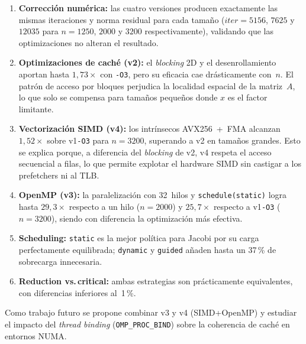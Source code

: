 \documentclass[a4paper,twocolumn]{article}
\begin{document}
\begin{enumerate}
  \item \textbf{Corrección numérica:} las cuatro versiones producen
        exactamente las mismas iteraciones y norma residual para cada
        tamaño ($\mathit{iter}{=}5156$, $7625$ y $12035$ para $n{=}1250$,
        $2000$ y $3200$ respectivamente), validando que las optimizaciones
        no alteran el resultado.
  \item \textbf{Optimizaciones de caché (v2):} el \textit{blocking} 2D y
        el desenrollamiento aportan hasta $1{,}73\times$ con \texttt{-O3},
        pero su eficacia cae drásticamente con~$n$. El patrón de acceso por
        bloques perjudica la localidad espacial de la matriz~$A$, lo que solo
        se compensa para tamaños pequeños donde $x$ es el factor limitante.
  \item \textbf{Vectorización SIMD (v4):} los intrínsecos AVX256~+~FMA
        alcanzan $1{,}52\times$ sobre v1\texttt{-O3} para $n{=}3200$,
        superando a v2 en tamaños grandes. Esto se explica porque, a diferencia
        del \textit{blocking} de v2, v4 respeta el acceso secuencial a filas,
        lo que permite explotar el hardware SIMD sin castigar a los prefetchers
        ni al TLB.
  \item \textbf{OpenMP (v3):} la paralelización con 32~hilos y
        \texttt{schedule(static)} logra hasta $29{,}3\times$ respecto a un
        hilo ($n{=}2000$) y $25{,}7\times$ respecto a v1\texttt{-O3}
        ($n{=}3200$), siendo con diferencia la optimización más efectiva.
  \item \textbf{Scheduling:} \texttt{static} es la mejor política para Jacobi
        por su carga perfectamente equilibrada; \texttt{dynamic} y
        \texttt{guided} añaden hasta un 37\,\% de sobrecarga innecesaria.
  \item \textbf{Reduction vs.\,critical:} ambas estrategias son
        prácticamente equivalentes, con diferencias inferiores al~1\,\%.
\end{enumerate}

Como trabajo futuro se propone combinar v3 y v4 (SIMD+OpenMP) y estudiar el
impacto del \textit{thread binding} (\texttt{OMP\_PROC\_BIND}) sobre la coherencia
de caché en entornos NUMA.
\end{document}
